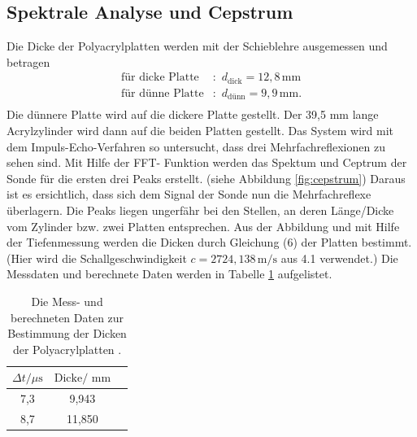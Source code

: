 \subsection{Spektrale Analyse und Cepstrum}
Die Dicke der Polyacrylplatten werden mit der Schieblehre ausgemessen und betragen
\begin{align*}
    \text{für dicke Platte}&:\,\, d_{\text{dick}} =12,8\, \text{mm}\\
    \text{für dünne Platte}&:\,\, d_{\text{dünn}} =9,9\, \text{mm}.\\
   \end{align*}
Die dünnere Platte wird auf die dickere Platte gestellt. Der 39,5 mm lange Acrylzylinder wird dann auf die beiden Platten gestellt.
Das System wird mit dem Impuls-Echo-Verfahren so untersucht, dass drei Mehrfachreflexionen zu sehen sind.
Mit Hilfe  der FFT- Funktion  werden das Spektum und Ceptrum der Sonde für die ersten drei Peaks erstellt. (siehe Abbildung \ref{fig:cepstrum})
Daraus ist es ersichtlich, dass sich dem Signal der Sonde
nun die Mehrfachreflexe überlagern. Die Peaks liegen ungerfähr bei den Stellen, an deren Länge/Dicke vom Zylinder bzw. zwei Platten entsprechen.
Aus der Abbildung und mit Hilfe der Tiefenmessung  werden die Dicken durch Gleichung (6) der Platten bestimmt.
(Hier wird die Schallgeschwindigkeit $c=2724,138\, \text{m/s} $ aus 4.1 verwendet.) 
Die Messdaten \cite{1}  und berechnete Daten werden in Tabelle \ref{tab:Ceptrum} aufgelistet.
\begin{table}[H]
   \centering
   \caption{Die Mess- und berechneten Daten zur Bestimmung der Dicken der Polyacrylplatten .}
   \label{tab:Ceptrum}
   \begin{tabular}{| c | c |c |}
   \hline
  $\Delta t/ \mu \text{s}$ &$\text{Dicke/ mm} $ \\
   \hline
   7,3&9,943\\
   \hline
   8,7&11,850\\
   \hline
\end{tabular}
\end{table}

